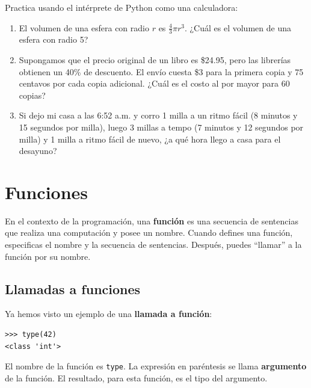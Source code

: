 \documentclass[10pt]{book}
\begin{document}
\begin{exercise}

Practica usando el intérprete de Python como una calculadora:

\begin{enumerate}

\item El volumen de una esfera con radio $r$ es $\frac{4}{3} \pi r^3$.
  ¿Cuál es el volumen de una esfera con radio 5?

\item Supongamos que el precio original de un libro es \$24.95, pero las librerías obtienen
  un 40\% de descuento.  El envío cuesta \$3 para la primera copia y 75 centavos
  por cada copia adicional.  ¿Cuál es el costo al por mayor para
  60 copias?

\item Si dejo mi casa a las 6:52 a.m. y corro 1 milla a un ritmo fácil
  (8 minutos y 15 segundos por milla), luego 3 millas a tempo (7 minutos y 12 segundos por milla) y 1 milla
  a ritmo fácil de nuevo, ¿a qué hora llego a casa para el desayuno?

\end{enumerate}
\end{exercise}


\chapter{Funciones}
\label{funcchap}

En el contexto de la programación, una {\bf función} es una secuencia de sentencias
que realiza una computación y posee un nombre.  Cuando defines una función,
especificas el nombre y la secuencia de sentencias.  Después, puedes
``llamar'' a la función por su nombre.

\section{Llamadas a funciones}
\label{functionchap}

Ya hemos visto un ejemplo de una {\bf llamada a función}:

\begin{verbatim}
>>> type(42)
<class 'int'>
\end{verbatim}
%
El nombre de la función es {\tt type}.  La expresión en paréntesis
se llama {\bf argumento} de la función.  El resultado, para esta
función, es el tipo del argumento.
\end{document}
